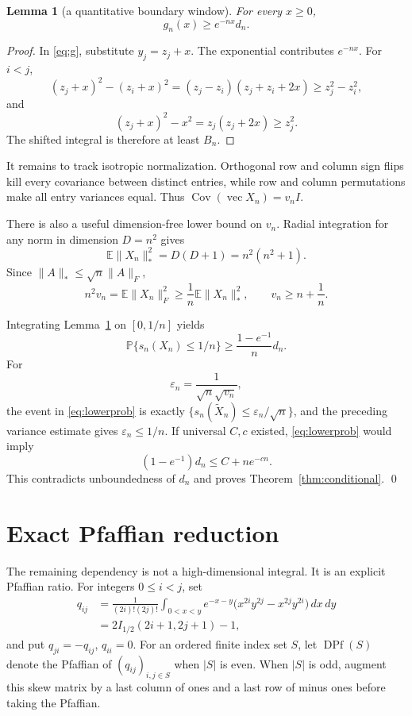 \documentclass[11pt]{article}
\newtheorem{lemma}{Lemma}
\newcommand{\E}{\mathbb E}
\newcommand{\Pp}{\mathbb P}
\begin{document}
\begin{lemma}[a quantitative boundary window]\label{lem:window}
For every $x\geq0$,
\[
 g_n(x)\geq e^{-nx}d_n.
\]
\end{lemma}
\begin{proof}
In \eqref{eq:g}, substitute $y_j=z_j+x$.  The exponential contributes
$e^{-nx}$.  For $i<j$,
\[
 (z_j+x)^2-(z_i+x)^2=(z_j-z_i)(z_j+z_i+2x)
 \geq z_j^2-z_i^2,
\]
and
\[
 (z_j+x)^2-x^2=z_j(z_j+2x)\geq z_j^2.
\]
The shifted integral is therefore at least $B_n$.
\end{proof}

It remains to track isotropic normalization.  Orthogonal row and column sign
flips kill every covariance between distinct entries, while row and column
permutations make all entry variances equal.  Thus
$\operatorname{Cov}(\operatorname{vec}X_n)=v_nI$.

There is also a useful dimension-free lower bound on $v_n$.  Radial
integration for any norm in dimension $D=n^2$ gives
\[
 \E\|X_n\|_*^2=D(D+1)=n^2(n^2+1).
\]
Since $\|A\|_*\leq\sqrt n\|A\|_F$,
\[
 n^2v_n=\E\|X_n\|_F^2
 \geq \frac1n\E\|X_n\|_*^2,
 \qquad v_n\geq n+\frac1n.\label{eq:variance}
\]

Integrating Lemma~\ref{lem:window} on $[0,1/n]$ yields
\begin{equation}\label{eq:lowerprob}
 \Pp\{s_n(X_n)\leq1/n\}
 \geq \frac{1-e^{-1}}{n}d_n.
\end{equation}
For
\[
 \varepsilon_n=\frac{1}{\sqrt n\sqrt{v_n}},
\]
the event in \eqref{eq:lowerprob} is exactly
$\{s_n(\widetilde X_n)\leq\varepsilon_n/\sqrt n\}$, and
the preceding variance estimate gives $\varepsilon_n\leq1/n$.  If universal $C,c$
existed, \eqref{eq:lowerprob} would imply
\[
 (1-e^{-1})d_n\leq C+n e^{-cn}.
\]
This contradicts unboundedness of $d_n$ and proves
Theorem~\ref{thm:conditional}.  \qed

\section*{Exact Pfaffian reduction}

The remaining dependency is not a high-dimensional integral.  It is an
explicit Pfaffian ratio.  For integers $0\leq i<j$, set
\begin{align}
 q_{ij}
 &=\frac{1}{(2i)!(2j)!}
 \int_{0<x<y}e^{-x-y}
   \bigl(x^{2i}y^{2j}-x^{2j}y^{2i}\bigr)\,dx\,dy\label{eq:qint}\\
 &=2I_{1/2}(2i+1,2j+1)-1,\label{eq:qbeta}
\end{align}
and put $q_{ji}=-q_{ij}$, $q_{ii}=0$.  For an ordered finite index set
$S$, let $\operatorname{DPf}(S)$ denote the Pfaffian of $(q_{ij})_{i,j\in S}$
when $|S|$ is even.  When $|S|$ is odd, augment this skew matrix by a last
column of ones and a last row of minus ones before taking the Pfaffian.
\end{document}
